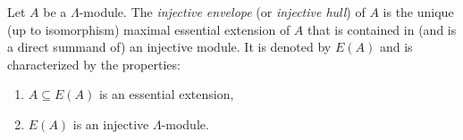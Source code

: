 Let $A$ be a $\Lambda$-module. The \emph{injective envelope} (or \emph{injective hull}) of $A$ is the unique (up to isomorphism) maximal essential extension of $A$ that is contained in (and is a direct summand of) an injective module. It is denoted by $E(A)$ and is characterized by the properties:
\begin{enumerate}
\item $A \subseteq E(A)$ is an essential extension,
\item $E(A)$ is an injective $\Lambda$-module.
\end{enumerate}
